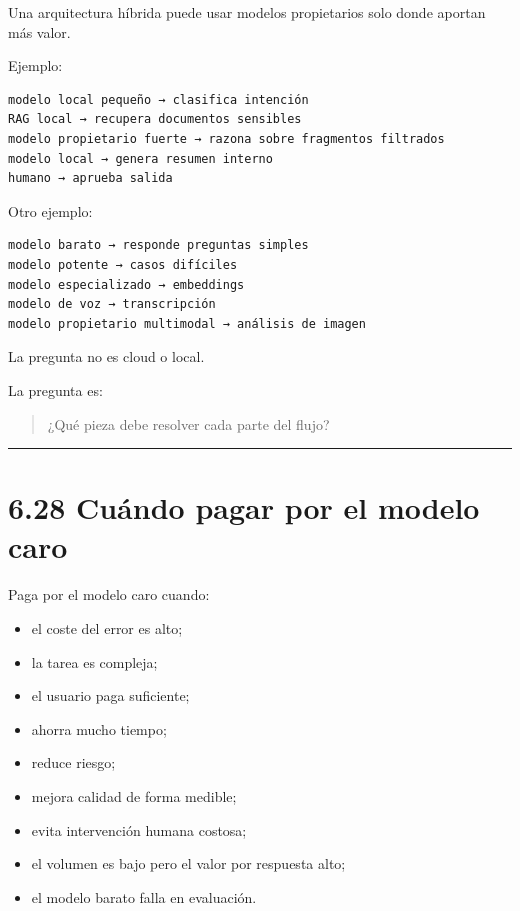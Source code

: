 Una arquitectura híbrida puede usar modelos propietarios solo donde
aportan más valor.

Ejemplo:

\begin{lstlisting}
modelo local pequeño → clasifica intención
RAG local → recupera documentos sensibles
modelo propietario fuerte → razona sobre fragmentos filtrados
modelo local → genera resumen interno
humano → aprueba salida
\end{lstlisting}

Otro ejemplo:

\begin{lstlisting}
modelo barato → responde preguntas simples
modelo potente → casos difíciles
modelo especializado → embeddings
modelo de voz → transcripción
modelo propietario multimodal → análisis de imagen
\end{lstlisting}

La pregunta no es cloud o local.

La pregunta es:

\begin{quote}
¿Qué pieza debe resolver cada parte del flujo?
\end{quote}

\begin{center}\rule{0.5\linewidth}{0.5pt}\end{center}

\section{6.28 Cuándo pagar por el modelo
caro}\label{cuuxe1ndo-pagar-por-el-modelo-caro}

Paga por el modelo caro cuando:

\begin{itemize}
\tightlist
\item
  el coste del error es alto;
\item
  la tarea es compleja;
\item
  el usuario paga suficiente;
\item
  ahorra mucho tiempo;
\item
  reduce riesgo;
\item
  mejora calidad de forma medible;
\item
  evita intervención humana costosa;
\item
  el volumen es bajo pero el valor por respuesta alto;
\item
  el modelo barato falla en evaluación.
\end{itemize}

